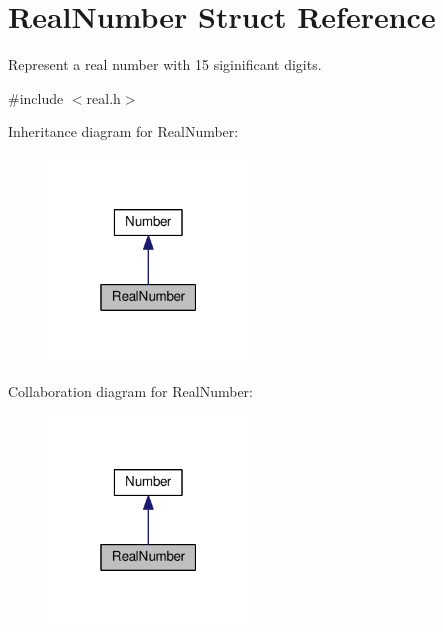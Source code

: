 \hypertarget{structRealNumber}{}\section{Real\+Number Struct Reference}
\label{structRealNumber}


Represent a real number with 15 siginificant digits.  




{\ttfamily \#include $<$real.\+h$>$}



Inheritance diagram for Real\+Number\+:\nopagebreak
\begin{figure}[H]
\begin{center}
\leavevmode
\includegraphics[width=151pt]{structRealNumber__inherit__graph}
\end{center}
\end{figure}


Collaboration diagram for Real\+Number\+:\nopagebreak
\begin{figure}[H]
\begin{center}
\leavevmode
\includegraphics[width=151pt]{structRealNumber__coll__graph}
\end{center}
\end{figure}
